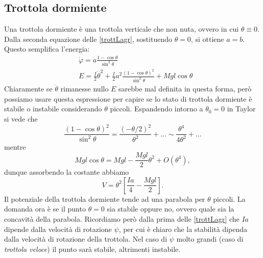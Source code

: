    \subsection{Trottola dormiente}
    Una trottola dormiente è una trottola verticale che non nuta, ovvero in cui $\theta\equiv0$. Dalla seconda equazione delle \ref{trottLagr}, sostituendo $\theta=0$, si ottiene $a=b$. Questo semplifica l'energia:
    \begin{equation}
        \begin{aligned}
            &\dot{\varphi} = a\frac{1-\cos\theta}{\sin^2\theta}\\
            &E = \frac{I}{2}\dot{\theta}^2+\frac{I}{2}a^2\frac{(1-\cos\theta)^2}{\sin^2\theta}+Mgl\cos\theta
        \end{aligned}
    \end{equation}
    Chiaramente se $\dot{\theta}$ rimanesse nullo $E$ sarebbe mal definita in questa forma, però possiamo usare questa espressione per capire se lo stato di trottola dormiente è stabile o instabile considerando $\theta$ piccoli. Espandendo intorno a $\theta_0=0$ in Taylor si vede che
    \begin{equation}
        \frac{(1-\cos\theta)^2}{\sin^2\theta} =\frac{ (-\theta/2)^2}{\theta^2} +\dots \sim \frac{\theta^4}{4\theta^2}+\dots
    \end{equation}
    mentre
    \begin{equation}
        Mgl\cos\theta = Mgl-\frac{Mgl}{2}\theta^2+ O(\theta^4),
    \end{equation}
    dunque assorbendo la costante abbiamo
    \begin{equation}
        V = \theta^2\left[\frac{Ia}{4}-\frac{Mgl}{2}\right].
    \end{equation}
    Il potenziale della trottola dormiente tende ad una parabola per $\theta$ piccoli. La domanda ora è se il punto $\theta=0$ sia stabile oppure no, ovvero quale sia la concavità della parabola. Ricordiamo però dalla prima delle \ref{trottLagr} che $Ia$ dipende dalla velocità di rotazione $\dot{\psi}$, per cui è chiaro che la stabilità dipenda dalla velocità di rotazione della trottola. Nel caso di $\dot{\psi}$ molto grandi (caso di \emph{trottola veloce}) il punto sarà stabile, altrimenti instabile.

